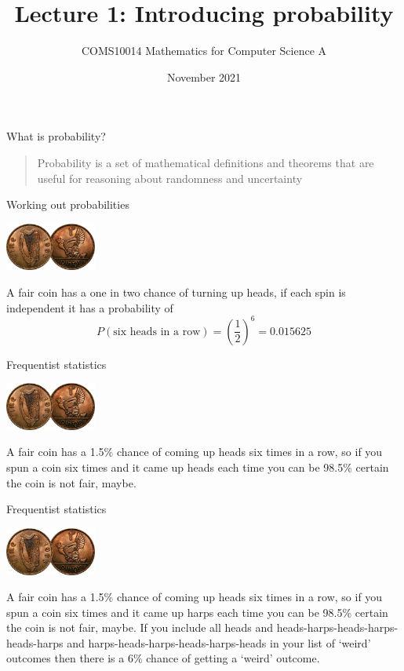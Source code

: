 \documentclass{beamer}
\title{Lecture 1: Introducing probability}
\author{COMS10014 Mathematics for Computer Science A}
\institute{\texttt{cs-uob.github.io/COMS10014/ and github.com/coms10011/2021\_22}}
\date{November 2021}
\newcommand{\crish}{\color{reddish}}
\newcommand{\cbla}{\color{black}}
\newcommand{\cblu}{\color{blue}}
\begin{document}
\maketitle
\begin{frame}{What is probability?}
  \begin{quote}
    Probability is a set of mathematical definitions and theorems that
    are useful for reasoning about randomness and uncertainty
  \end{quote}
\end{frame}

\begin{frame}{Working out probabilities}
  \begin{center}
    \includegraphics[width=3cm]{1d.jpg}
    \end{center}
  A fair coin has a one in two chance of turning up heads, if each spin is independent it has a probability of
  \crish$$P(\mbox{six heads in a row})=\left(\frac{1}{2}\right)^6=0.015625$$\cbla{}
\end{frame}

\begin{frame}{Frequentist statistics}
    \begin{center}
    \includegraphics[width=3cm]{1d.jpg}
    \end{center}
A fair coin has a 1.5\% chance of coming up heads six times in a row,
so if you spun a coin six times and it came up heads each time you can
be 98.5\% certain the coin is not fair, maybe.
\end{frame}

\begin{frame}{Frequentist statistics}
    \begin{center}
    \includegraphics[width=3cm]{1d.jpg}
    \end{center}
A fair coin has a 1.5\% chance of coming up heads six times in a row,
so if you spun a coin six times and it came up harps each time you can
be 98.5\% certain the coin is not fair, maybe.
\cblu{}
If you include all heads and heads-harps-heads-harps-heads-harps and
harps-heads-harps-heads-harps-heads in your list of `weird' outcomes
then there is a 6$\%$ chance of getting a `weird' outcome.\cbla{}
\end{frame}
\end{document}
